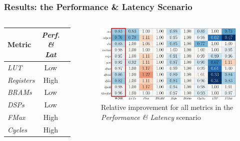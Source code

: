 \documentclass[10pt, compress, xcolor={table,xcdraw,usenames}, aspectratio=169]{beamer}
\begin{document}
\begin{frame}
    \frametitle{Results: the Performance \& Latency Scenario}
    \begin{columns}[T,onlytextwidth]
        \begin{table}[htpb]
            \scriptsize
            \centering
            \begin{tabular}{@{}lcccc@{}}
                \toprule
                Metric & \textit{Perf. \& Lat} \\ \midrule
                \textit{LUT} & \cellcolor[HTML]{DD9583} Low \\
                \textit{Registers} & \cellcolor[HTML]{9B94B6} High \\
                \textit{BRAMs} & \cellcolor[HTML]{DD9583} Low \\
                \textit{DSPs} & \cellcolor[HTML]{DD9583} Low \\
                \textit{FMax} & \cellcolor[HTML]{9B94B6} High \\
                \textit{Cycles} & \cellcolor[HTML]{9B94B6} High \\ \bottomrule
            \end{tabular}
        \end{table}

        \begin{figure}[htpb]
            \centering
            \includegraphics[width=0.8\columnwidth]{heatmap_default_stratixV_perflat}
            \caption{Relative improvement for all metrics in the
            \textit{Performance \& Latency} scenario}
        \end{figure}
    \end{columns}
\end{frame}
\end{document}
